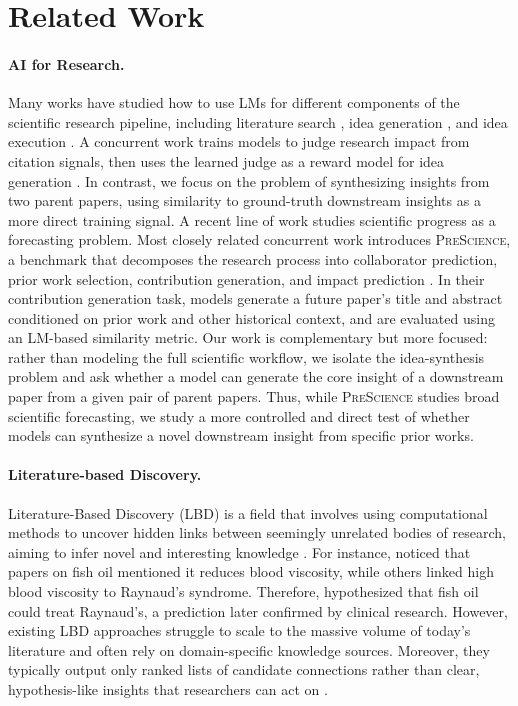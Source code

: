 \section{Related Work}
\paragraph{AI for Research.}
Many works have studied how to use LMs for different components of the scientific research pipeline, including literature search \citep{openai_deep_research, zheng-etal-2025-deepresearcher}, idea generation \citep{si2024can, wang-etal-2024-scimon}, and idea execution \citep{si2025ideation, si2026towards, karpathy2026autoresearch}. A concurrent work trains models to judge research impact from citation signals, then uses the learned judge as a reward model for idea generation \citep{tong2026ai}. In contrast, we focus on the problem of synthesizing insights from two parent papers, using similarity to ground-truth downstream insights as a more direct training signal. A recent line of work studies scientific progress as a forecasting problem. Most closely related concurrent work introduces \textsc{PreScience}, a benchmark that decomposes the research process into collaborator prediction, prior work selection, contribution generation, and impact prediction \citep{ajith2026prescience}. In their contribution generation task, models generate a future paper's title and abstract conditioned on prior work and other historical context, and are evaluated using an LM-based similarity metric. Our work is complementary but more focused: rather than modeling the full scientific workflow, we isolate the idea-synthesis problem and ask whether a model can generate the core insight of a downstream paper from a given pair of parent papers. Thus, while \textsc{PreScience} studies broad scientific forecasting, we study a more controlled and direct test of whether models can synthesize a novel downstream insight from specific prior works.


\paragraph{Literature-based Discovery.}
Literature-Based Discovery (LBD) is a field that involves using computational methods to uncover hidden links between seemingly unrelated bodies of research, aiming to infer novel and interesting knowledge \citep{swanson1986fish, swanson2008literature}. For instance, \cite{swanson1986undiscovered} noticed that papers on fish oil mentioned it reduces blood viscosity, while others linked high blood viscosity to Raynaud’s syndrome. Therefore, \cite{swanson1986undiscovered} hypothesized that fish oil could treat Raynaud’s, a prediction later confirmed by clinical research. However, existing LBD approaches struggle to scale to the massive volume of today’s literature and often rely on domain-specific knowledge sources. Moreover, they typically output only ranked lists of candidate connections rather than clear, hypothesis-like insights that researchers can act on \citep{sebastian2017emerging, ganiz2005recent, bekhuis2006conceptual, smalheiser2012literature}. 

